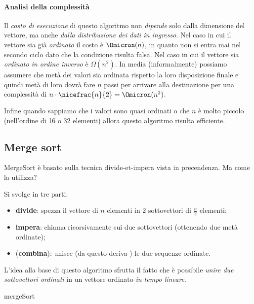 \paragraph{Analisi della complessità}
Il \emph{costo di esecuzione} di questo algoritmo non \emph{dipende} solo dalla dimensione del vettore, ma anche \emph{dalla distribuzione dei dati in ingresso}.
Nel caso in cui il vettore sia già \emph{ordinato} il costo è \(\Omicron(n)\), in quanto non si entra mai nel secondo ciclo dato che la condizione risulta falsa.
Nel caso in cui il vettore sia \emph{ordinato in ordine inverso} è \(\Omega(n^2)\).
In media (informalmente) possiamo assumere che metà dei valori sia ordinata rispetto la loro disposizione finale e quindi metà di loro dovrà fare \(n\) passi per arrivare alla destinazione per una complessità di \(n \cdot \nicefrac{n}{2} = \Omicron(n^2)\).

Infine quando sappiamo che i valori sono quasi ordinati o che \(n\) è molto piccolo (nell'ordine di 16 o 32 elementi) allora questo algoritmo risulta efficiente.

\clearpage
\subsection{Merge sort}

MergeSort è basato sulla tecnica divide-et-impera vista in precendenza.
Ma come la utilizza?

\begin{definition}
Si svolge in tre parti:
\begin{itemize}
	\item \textbf{divide}: spezza il vettore di \(n\) elementi in 2 sottovettori di \(\frac n 2\) elementi;
	\item \textbf{impera}: chiama \mergeSort ricorsivamente sui due sottovettori (ottenendo due metà ordinate);
	\item (\textbf{combina}): unisce (da questo deriva ) le due sequenze ordinate.
\end{itemize}
\end{definition}

L'idea alla base di questo algoritmo sfrutta il fatto che è possibile \emph{unire due sottovettori ordinati} in un vettore ordinato \emph{in tempo lineare}.

\begin{algorithm}[H]
	\caption{mergeSort}
	
	
\end{algorithm}

